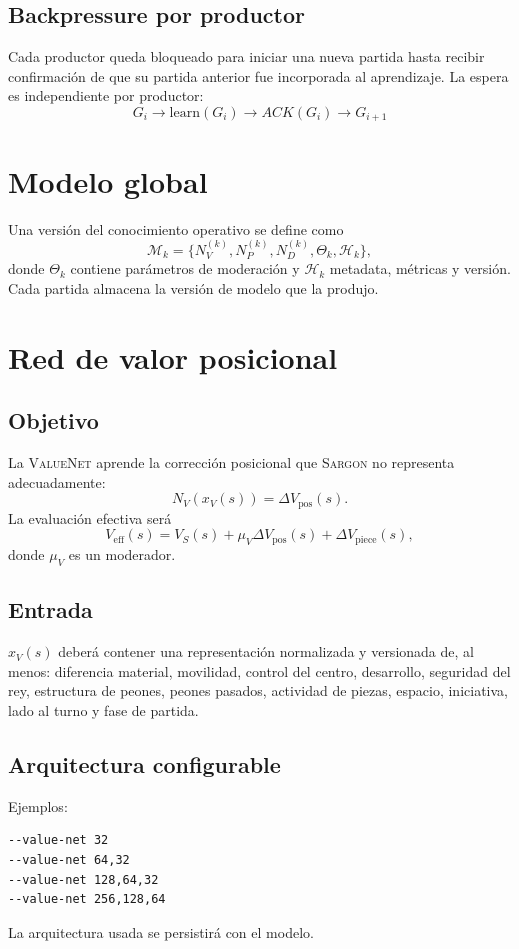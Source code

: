 \documentclass[11pt,a4paper]{article}
\newcommand{\Sargon}{\textsc{Sargon}}
\newcommand{\ValueNet}{\textsc{ValueNet}}
\newcommand{\Model}{\mathcal{M}}
\begin{document}
\subsection{Backpressure por productor}
Cada productor queda bloqueado para iniciar una nueva partida hasta recibir confirmación de que su partida anterior fue incorporada al aprendizaje. La espera es independiente por productor:
\[
\boxed{G_i\rightarrow\text{learn}(G_i)\rightarrow ACK(G_i)\rightarrow G_{i+1}}
\]

\section{Modelo global}
Una versión del conocimiento operativo se define como
\[
\Model_k=\{N_V^{(k)},N_P^{(k)},N_D^{(k)},\Theta_k,\mathcal{H}_k\},
\]
donde $\Theta_k$ contiene parámetros de moderación y $\mathcal{H}_k$ metadata, métricas y versión. Cada partida almacena la versión de modelo que la produjo.

\section{Red de valor posicional}
\subsection{Objetivo}
La \ValueNet{} aprende la corrección posicional que \Sargon{} no representa adecuadamente:
\[
N_V(x_V(s))=\Delta V_{\mathrm{pos}}(s).
\]
La evaluación efectiva será
\[
V_{\mathrm{eff}}(s)=V_S(s)+\mu_V\Delta V_{\mathrm{pos}}(s)+\Delta V_{\mathrm{piece}}(s),
\]
donde $\mu_V$ es un moderador.

\subsection{Entrada}
$x_V(s)$ deberá contener una representación normalizada y versionada de, al menos: diferencia material, movilidad, control del centro, desarrollo, seguridad del rey, estructura de peones, peones pasados, actividad de piezas, espacio, iniciativa, lado al turno y fase de partida.

\subsection{Arquitectura configurable}
Ejemplos:
\begin{lstlisting}
--value-net 32
--value-net 64,32
--value-net 128,64,32
--value-net 256,128,64
\end{lstlisting}
La arquitectura usada se persistirá con el modelo.
\end{document}
